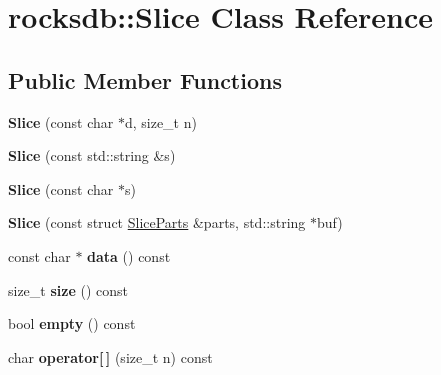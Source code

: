 \hypertarget{classrocksdb_1_1Slice}{}\section{rocksdb\+:\+:Slice Class Reference}
\label{classrocksdb_1_1Slice}
\subsection*{Public Member Functions}
\begin{DoxyCompactItemize}
\item 
{\bfseries Slice} (const char $\ast$d, size\+\_\+t n)\hypertarget{classrocksdb_1_1Slice_ac0379e6948821c52c7e6d683f1dcf291}{}\label{classrocksdb_1_1Slice_ac0379e6948821c52c7e6d683f1dcf291}

\item 
{\bfseries Slice} (const std\+::string \&s)\hypertarget{classrocksdb_1_1Slice_a287be63b816a80d873b68bf845f2b0bc}{}\label{classrocksdb_1_1Slice_a287be63b816a80d873b68bf845f2b0bc}

\item 
{\bfseries Slice} (const char $\ast$s)\hypertarget{classrocksdb_1_1Slice_a7ea329001e3327031f1d1b5c2ebdb85f}{}\label{classrocksdb_1_1Slice_a7ea329001e3327031f1d1b5c2ebdb85f}

\item 
{\bfseries Slice} (const struct \hyperlink{structrocksdb_1_1SliceParts}{Slice\+Parts} \&parts, std\+::string $\ast$buf)\hypertarget{classrocksdb_1_1Slice_aa29629931fae88e4983114cc2b2fba3c}{}\label{classrocksdb_1_1Slice_aa29629931fae88e4983114cc2b2fba3c}

\item 
const char $\ast$ {\bfseries data} () const\hypertarget{classrocksdb_1_1Slice_a45ddb160067bdfba5533d545820722f2}{}\label{classrocksdb_1_1Slice_a45ddb160067bdfba5533d545820722f2}

\item 
size\+\_\+t {\bfseries size} () const\hypertarget{classrocksdb_1_1Slice_a5be056876e9de9e8386bf804097e05d2}{}\label{classrocksdb_1_1Slice_a5be056876e9de9e8386bf804097e05d2}

\item 
bool {\bfseries empty} () const\hypertarget{classrocksdb_1_1Slice_a89e31d492f40c4301329652215b7a932}{}\label{classrocksdb_1_1Slice_a89e31d492f40c4301329652215b7a932}

\item 
char {\bfseries operator\mbox{[}$\,$\mbox{]}} (size\+\_\+t n) const\hypertarget{classrocksdb_1_1Slice_a70cd2682180b87e0b608ee62d78a1f3f}{}\label{classrocksdb_1_1Slice_a70cd2682180b87e0b608ee62d78a1f3f}


\end{DoxyCompactItemize}
